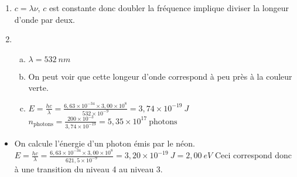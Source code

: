 \documentclass[12pt, a4paper]{article}
\begin{document}
    \begin{Exercise}[number={34}]
        \begin{enumerate}[1.]
            \item	$c=\lambda\nu$, $c$ est constante donc doubler la fréquence implique diviser la longeur d'onde par deux.
            \item   \begin{enumerate}[a.]
                        \item	$\lambda=532\ \si{nm}$
                        \item   On peut voir que cette longeur d'onde correspond à peu près à la couleur verte.
                        \item   $E=\frac{hc}{\lambda}=\frac{6{,}63\times 10^{-34}\times 3{,}00\times 10^{8}}{532\times 10^{-9}}=3{,}74\times 10^{-19}\ \si{J}$ \\ $n_\text{photons}=\frac{200\times 10^{-3}}{3{,}74\times 10^{-19}}=5{,}35\times 10^{17}\ \text{photons}$
                    \end{enumerate}
        \end{enumerate}
    \end{Exercise}

    \begin{Exercise}[number={36}]
        \begin{itemize}
            \item[] On calcule l'énergie d'un photon émis par le néon. \smallbreak $E=\frac{hc}{\lambda}=\frac{6{,}63\times 10^{-34}\times 3{,}00\times 10^{8}}{621{,}5\times 10^{-9}}=3{,}20\times 10^{-19}\ \si{J}=2{,}00\ \si{eV}$ \smallbreak Ceci correspond donc à une transition du niveau 4 au niveau 3.
        \end{itemize}
    \end{Exercise}
\end{document}
